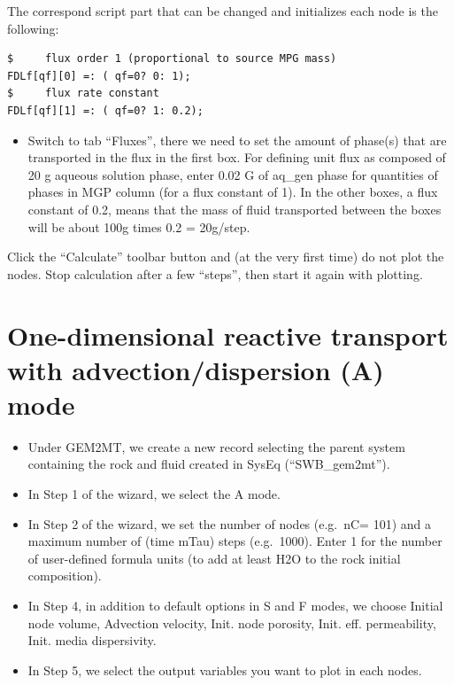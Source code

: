 \documentclass[
]{book}
\providecommand{\tightlist}{%
  \setlength{\itemsep}{0pt}\setlength{\parskip}{0pt}}
\begin{document}
The correspond script part that can be changed and initializes each node is the following:

\begin{verbatim}
$     flux order 1 (proportional to source MPG mass)
FDLf[qf][0] =: ( qf=0? 0: 1);
$     flux rate constant
FDLf[qf][1] =: ( qf=0? 1: 0.2);
\end{verbatim}

\begin{itemize}
\tightlist
\item
  Switch to tab ``Fluxes'', there we need to set the amount of phase(s) that are transported in the flux in the first box. For defining unit flux as composed of 20 g aqueous solution phase, enter 0.02 G of aq\_gen phase for quantities of phases in MGP column (for a flux constant of 1). In the other boxes, a flux constant of 0.2, means that the mass of fluid transported between the boxes will be about 100g times 0.2 = 20g/step.
\end{itemize}

Click the ``Calculate'' toolbar button and (at the very first time) do not plot the nodes. Stop calculation after a few ``steps'', then start it again with plotting.

\hypertarget{one-dimensional-reactive-transport-with-advectiondispersion-a-mode}{%
\section{One-dimensional reactive transport with advection/dispersion (A) mode}\label{one-dimensional-reactive-transport-with-advectiondispersion-a-mode}}

\begin{itemize}
\item
  Under GEM2MT, we create a new record selecting the parent system containing the rock and fluid created in SysEq (``SWB\_gem2mt'').
\item
  In Step 1 of the wizard, we select the A mode.
\item
  In Step 2 of the wizard, we set the number of nodes (e.g.~nC= 101) and a maximum number of (time mTau) steps (e.g.~1000). Enter 1 for the number of user-defined formula units (to add at least H2O to the rock initial composition).
\item
  In Step 4, in addition to default options in S and F modes, we choose Initial node volume, Advection velocity, Init. node porosity, Init. eff. permeability, Init. media dispersivity.
\item
  In Step 5, we select the output variables you want to plot in each nodes.
\end{itemize}
\end{document}
